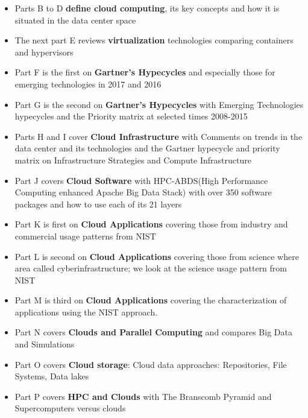 \begin{itemize}

\item Parts B to D \textbf{define cloud computing}, its key concepts
  and how it is situated in the data center space

\item The next part E reviews \textbf{virtualization} technologies
  comparing containers and hypervisors

\item Part F is the first on \textbf{Gartner's Hypecycles} and
  especially those for emerging technologies in 2017 and 2016

\item Part G is the second on \textbf{Gartner's Hypecycles} with
  Emerging Technologies hypecycles and the Priority matrix at selected
  times 2008-2015

\item Parts H and I cover \textbf{Cloud Infrastructure} with Comments
  on trends in the data center and its technologies and the Gartner
  hypecycle and priority matrix on Infrastructure Strategies and
  Compute Infrastructure

\item Part J covers \textbf{Cloud Software} with HPC-ABDS(High
  Performance Computing enhanced Apache Big Data Stack) with over 350
  software packages and how to use each of its 21 layers

\item Part K is first on \textbf{Cloud Applications} covering those
  from industry and commercial usage patterns from NIST

\item Part L is second on \textbf{Cloud Applications} covering those
  from science where area called cyberinfrastructure; we look at the
  science usage pattern from NIST

\item Part M is third on \textbf{Cloud Applications} covering the
  characterization of applications using the NIST approach.

\item Part N covers \textbf{Clouds and Parallel Computing} and
  compares Big Data and Simulations

\item Part O covers \textbf{Cloud storage}: Cloud data approaches:
  Repositories, File Systems, Data lakes

\item Part P covers \textbf{HPC and Clouds} with The Branscomb Pyramid
  and Supercomputers versus clouds


\end{itemize}
